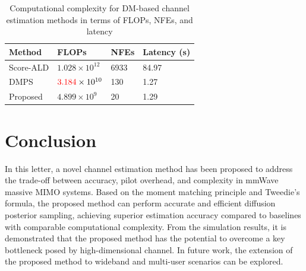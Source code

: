 \documentclass[lettersize,journal]{IEEEtran}
\newcommand{\tred}{\textcolor{red}}
\begin{document}
\begin{table}[!t]
\centering
\renewcommand{\arraystretch}{1.1} 
\caption{Computational complexity for DM-based channel estimation methods in terms of FLOPs, NFEs, and latency}
\label{tab:table1}
\begin{tabular}{M{0.20\columnwidth}|M{0.21\columnwidth}|M{0.20\columnwidth}|M{0.20\columnwidth}}
\hline
\textbf{Method} & \textbf{FLOPs} & \textbf{NFEs} & \textbf{Latency (s)} \\
\hline
Score-ALD\cite{arvinteMIMOChannelEstimation2023} & \(1.028 \times 10^{12}\) & 6933 & 84.97 \\
\hline
DMPS\cite{zhouGenerativeDiffusionModels2025} & \(\tred{3.184} \times 10^{10}\) & 130 & 1.27 \\
\hline
Proposed & \(4.899 \times 10^9\) & 20 & 1.29 \\
\hline
\end{tabular}
\end{table}

\section{Conclusion}

In this letter, a novel channel estimation method has been proposed to address the trade-off between accuracy, pilot overhead, and complexity in mmWave massive MIMO systems. Based on the moment matching principle and Tweedie's formula, the proposed method can perform accurate and efficient diffusion posterior sampling, achieving superior estimation accuracy compared to baselines with comparable computational complexity. From the simulation results, it is demonstrated that the proposed method has the potential to overcome a key bottleneck posed by high-dimensional channel. In future work, the extension of the proposed method to wideband and multi-user scenarios can be explored.


% 

\end{document}

